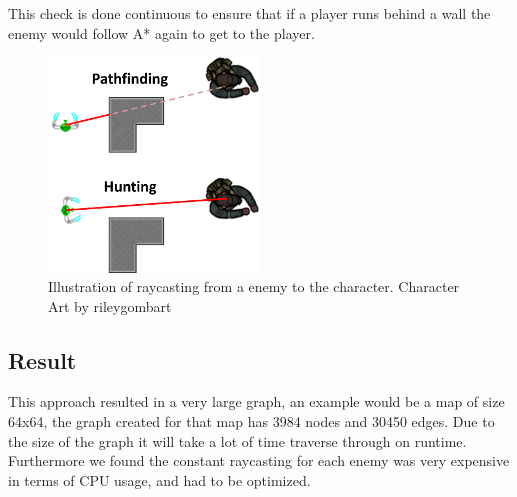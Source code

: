 This check is done continuous to ensure that if a player runs behind a wall the enemy would follow A* again to get to the player.
\begin{figure}[H]
\begin{center}
	\includegraphics[width=0.5\textwidth]{figures/astar/raycast}
	\caption{Illustration of raycasting from a enemy to the character. Character Art by rileygombart\cite{artist}}
	\label{raycast}
\end{center}
\end{figure}

\subsection*{Result}
This approach resulted in a very large graph, an example would be a map of size 64x64, the graph created for that map has 3984 nodes and 30450 edges. Due to the size of the graph it will take a lot of time traverse through on runtime.
Furthermore we found the constant raycasting for each enemy was very expensive in terms of CPU usage, and had to be optimized.
